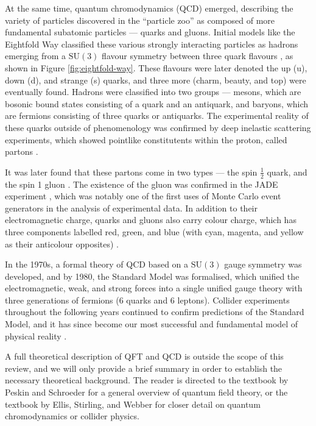 \documentclass[12pt,a4paper]{report}
\begin{document}
At the same time, quantum chromodynamics (QCD) emerged, describing the variety of particles discovered in the ``particle zoo'' as composed of more fundamental subatomic particles --- quarks and gluons. Initial models like the Eightfold Way classified these various strongly interacting particles as hadrons emerging from a $\text{SU}(3)$ flavour symmetry between three quark flavours \cite{Neeman:1961jhl,Gell-Mann:1962yej}, as shown in Figure \ref{fig:eightfold-way}. These flavours were later denoted the up (u), down (d), and strange (s) quarks, and three more (charm, beauty, and top) were eventually found. Hadrons were classified into two groups --- mesons, which are bosonic bound states consisting of a quark and an antiquark, and baryons, which are fermions consisting of three quarks or antiquarks. The experimental reality of these quarks outside of phenomenology was confirmed by deep inelastic scattering experiments, which showed pointlike constitutents within the proton, called partons \cite{Thomson:2013zua,Ellis:1996mzs}.

It was later found that these partons come in two types --- the spin $\frac{1}{2}$ quark, and the spin 1 gluon \cite{ParticleDataGroup:2024cfk}. The existence of the gluon was confirmed in the JADE experiment \cite{JADE:1979rke}, which was notably one of the first uses of Monte Carlo event generators in the analysis of experimental data. In addition to their electromagnetic charge, quarks and gluons also carry colour charge, which has three components labelled red, green, and blue (with cyan, magenta, and yellow as their anticolour opposites) \cite{Thomson:2013zua,ParticleDataGroup:2024cfk}.

In the 1970s, a formal theory of QCD based on a $\text{SU}(3)$ gauge symmetry was developed, and by 1980, the Standard Model was formalised, which unified the electromagnetic, weak, and strong forces into a single unified gauge theory with three generations of fermions (6 quarks and 6 leptons). Collider experiments throughout the following years continued to confirm predictions of the Standard Model, and it has since become our most successful and fundamental model of physical reality \cite{Thomson:2013zua, Schwartz:2014sze}.

A full theoretical description of QFT and QCD is outside the scope of this review, and we will only provide a brief summary in order to establish the necessary theoretical background. The reader is directed to the textbook by Peskin and Schroeder \cite{Peskin:1995ev} for a general overview of quantum field theory, or the textbook by Ellis, Stirling, and Webber \cite{Ellis:1996mzs} for closer detail on quantum chromodynamics or collider physics.
\end{document}

